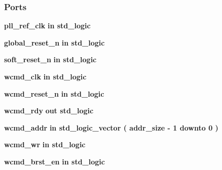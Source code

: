 \subsubsection*{Ports}
 \begin{DoxyCompactItemize}
\item 
{\bf pll\+\_\+ref\+\_\+clk}  {\bfseries {\bfseries \textcolor{keywordflow}{in}\textcolor{vhdlchar}{ }}} {\bfseries \textcolor{comment}{std\+\_\+logic}\textcolor{vhdlchar}{ }} 
\item 
{\bf global\+\_\+reset\+\_\+n}  {\bfseries {\bfseries \textcolor{keywordflow}{in}\textcolor{vhdlchar}{ }}} {\bfseries \textcolor{comment}{std\+\_\+logic}\textcolor{vhdlchar}{ }} 
\item 
{\bf soft\+\_\+reset\+\_\+n}  {\bfseries {\bfseries \textcolor{keywordflow}{in}\textcolor{vhdlchar}{ }}} {\bfseries \textcolor{comment}{std\+\_\+logic}\textcolor{vhdlchar}{ }} 
\item 
{\bf wcmd\+\_\+clk}  {\bfseries {\bfseries \textcolor{keywordflow}{in}\textcolor{vhdlchar}{ }}} {\bfseries \textcolor{comment}{std\+\_\+logic}\textcolor{vhdlchar}{ }} 
\item 
{\bf wcmd\+\_\+reset\+\_\+n}  {\bfseries {\bfseries \textcolor{keywordflow}{in}\textcolor{vhdlchar}{ }}} {\bfseries \textcolor{comment}{std\+\_\+logic}\textcolor{vhdlchar}{ }} 
\item 
{\bf wcmd\+\_\+rdy}  {\bfseries {\bfseries \textcolor{keywordflow}{out}\textcolor{vhdlchar}{ }}} {\bfseries \textcolor{comment}{std\+\_\+logic}\textcolor{vhdlchar}{ }} 
\item 
{\bf wcmd\+\_\+addr}  {\bfseries {\bfseries \textcolor{keywordflow}{in}\textcolor{vhdlchar}{ }}} {\bfseries \textcolor{comment}{std\+\_\+logic\+\_\+vector}\textcolor{vhdlchar}{ }\textcolor{vhdlchar}{(}\textcolor{vhdlchar}{ }\textcolor{vhdlchar}{ }\textcolor{vhdlchar}{ }\textcolor{vhdlchar}{ }{\bfseries {\bf addr\+\_\+size}} \textcolor{vhdlchar}{-\/}\textcolor{vhdlchar}{ } \textcolor{vhdldigit}{1} \textcolor{vhdlchar}{ }\textcolor{keywordflow}{downto}\textcolor{vhdlchar}{ }\textcolor{vhdlchar}{ } \textcolor{vhdldigit}{0} \textcolor{vhdlchar}{ }\textcolor{vhdlchar}{)}\textcolor{vhdlchar}{ }} 
\item 
{\bf wcmd\+\_\+wr}  {\bfseries {\bfseries \textcolor{keywordflow}{in}\textcolor{vhdlchar}{ }}} {\bfseries \textcolor{comment}{std\+\_\+logic}\textcolor{vhdlchar}{ }} 
\item 
{\bf wcmd\+\_\+brst\+\_\+en}  {\bfseries {\bfseries \textcolor{keywordflow}{in}\textcolor{vhdlchar}{ }}} {\bfseries \textcolor{comment}{std\+\_\+logic}\textcolor{vhdlchar}{ }} 

\end{DoxyCompactItemize}
